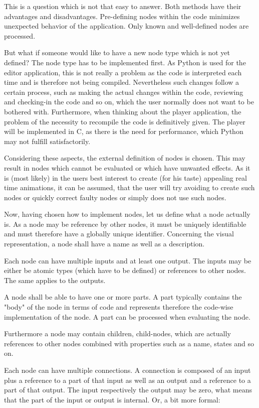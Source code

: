 \documentclass[10pt, openright, notitlepage]{scrreprt}
\begin{document}
This is a question which is not that easy to answer. Both methods have their
advantages and disadvantages. Pre-defining nodes within the code minimizes
unexpected behavior of the application. Only known and well-defined nodes are
processed.

But what if someone would like to have a new node type which is not yet defined?
The node type has to be implemented first. As Python is used for the editor
application, this is not really a problem as the code is interpreted each time
and is therefore not being compiled. Nevertheless such changes follow a certain
process, such as making the actual changes within the code, reviewing and
checking-in the code and so on, which the user normally does not want to be
bothered with. Furthermore, when thinking about the player application, the
problem of the necessity to recompile the code is definitively given. The player
will be implemented in C, as there is the need for performance, which Python may
not fulfill satisfactorily.

Considering these aspects, the external definition of nodes is chosen. This may
result in nodes which cannot be evaluated or which have unwanted effects. As it
is (most likely) in the users best interest to create (for his taste) appealing
real time animations, it can be assumed, that the user will try avoiding to
create such nodes or quickly correct faulty nodes or simply does not use such
nodes.

Now, having chosen how to implement nodes, let us define what a node actually
is. As a node may be reference by other nodes, it must be uniquely identifiable
and must therefore have a globally unique identifier. Concerning the visual
representation, a node shall have a name as well as a description.

Each node can have multiple inputs and at least one output. The inputs may be
either be atomic types (which have to be defined) or references to other nodes.
The same applies to the outputs.

A node shall be able to have one or more parts. A part typically contains the
"body" of the node in terms of code and represents therefore the code-wise
implementation of the node. A part can be processed when evaluating the node.

Furthermore a node may contain children, child-nodes, which are actually
references to other nodes combined with properties such as a name, states and so
on.

Each node can have multiple connections. A connection is composed of an input
plus a reference to a part of that input as well as an output and a reference to
a part of that output. The input respectively the output may be zero, what means
that the part of the input or output is internal. Or, a bit more formal:
\end{document}
